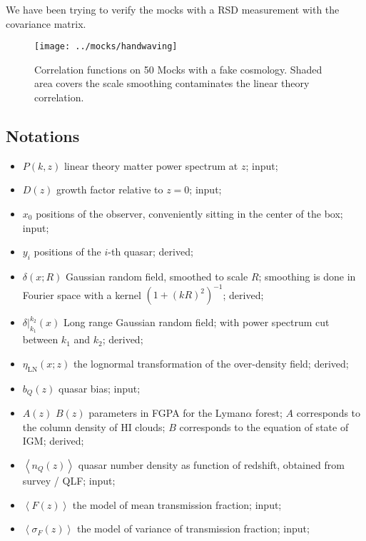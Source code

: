 \documentclass{paper}
\begin{document}
    We have been trying to verify the mocks with a RSD
    measurement with the covariance matrix. 
    \begin{figure}
        \texttt{[image: ../mocks/handwaving]}
        \caption{Correlation functions on 50 Mocks with a
        fake cosmology. Shaded area covers the scale
        smoothing contaminates the linear theory correlation.  }
        \label{fig:handwave}
    \end{figure}

\subsection{Notations}
\begin{itemize}
    \item $P(k, z)$
        linear theory matter power spectrum at $z$; input;
    \item $D(z)$
        growth factor relative to $z=0$; input;

    \item $x_0$ positions of the observer, conveniently
        sitting in the center of the box; input;

    \item $y_i$ positions of the $i$-th quasar; derived;

    \item $\delta(x; R)$ 
        Gaussian random field, smoothed to scale $R$;
        smoothing is done in Fourier space with a kernel 
        $(1 + (kR)^2)^{-1}$; derived;
    \item $\delta|_{k_1}^{k_2}(x)$ 
        Long range Gaussian random field; with power
        spectrum cut between $k_1$ and $k_2$; derived;

    \item $\eta_\mathrm{LN}(x; z)$ the lognormal
        transformation of the over-density field; derived;

    \item $b_Q(z)$ quasar bias; input;

    \item $A(z)$ $B(z)$ parameters in FGPA for 
        the Lyman$\alpha$ forest; $A$ corresponds to the
        column density of HI clouds; $B$ corresponds to the 
        equation of state of IGM; derived;

    \item $\left<n_Q(z)\right>$ quasar number density as
        function of redshift, obtained from survey / QLF;
        input;
    \item $\left<F(z)\right>$ the model of mean transmission
        fraction; input;
    \item $\left<\sigma_F(z)\right>$ the model of variance of
        transmission fraction; input;

\end{itemize}
\end{document}
